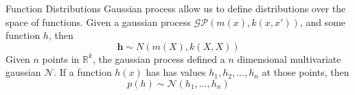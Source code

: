 \documentclass[10pt]{beamer}
\begin{document}
\begin{frame}{Function Distributions}
  Gaussian process allow us to define distributions over the space of functions. Given a gaussian process $\mathcal{GP} \left( m(x) , k(x,x') \right)$, and some function $h$, then
  \begin{equation}
    \mathbf{h} \sim N(m(X) , k(X,X))
  \end{equation}
  Given $n$ points in $\mathbb{R}^{k}$, the gaussian process defined a $n$ dimensional multivariate gaussian $\mathcal{N}$. If a function $h(x)$ has has values $h_1,h_2,...,h_{n}$ at those points, then
  \begin{equation}
    p \left( h \right) \sim \mathcal{N}(h_{1}, ..., h_{n})
  \end{equation}

  \begin{center}
  \end{center}
\end{frame}
\end{document}
